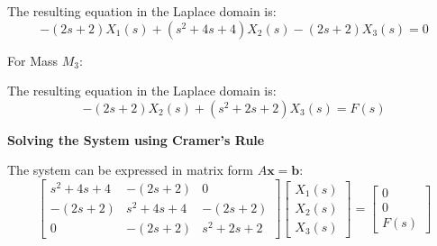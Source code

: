 \documentclass[11pt]{article}
\begin{document}
The resulting equation in the Laplace domain is:
\begin{equation}
-(2s + 2)X_1(s) + (s^2 + 4s + 4)X_2(s) - (2s + 2)X_3(s) = 0 \tag{2}
\end{equation}

\newpage

\vspace{12pt}
{For Mass $M_3$:}
\begin{figure}[h!]
\centering
{}
\end{figure}

The resulting equation in the Laplace domain is:
\begin{equation}
-(2s + 2)X_2(s) + (s^2 + 2s + 2)X_3(s) = F(s) \tag{3}
\end{equation}

\noindent\textbf{Solving the System using Cramer's Rule}
\vspace{12pt}

The system can be expressed in matrix form $A\mathbf{x} = \mathbf{b}$:
$$
\begin{bmatrix}
s^2 + 4s + 4 & -(2s + 2) & 0 \\
-(2s + 2) & s^2 + 4s + 4 & -(2s + 2) \\
0 & -(2s + 2) & s^2 + 2s + 2
\end{bmatrix}
\begin{bmatrix}
X_1(s) \\
X_2(s) \\
X_3(s)
\end{bmatrix}
=
\begin{bmatrix}
0 \\
0 \\
F(s)
\end{bmatrix}
$$
\end{document}
